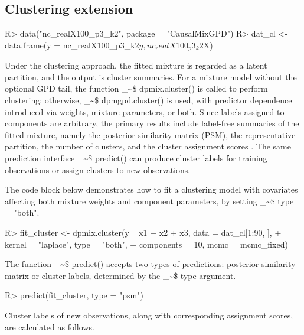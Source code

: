 \documentclass[preprint,12pt,authoryear]{elsarticle}
\makeatletter
\newcommand\code{\bgroup\@makeother\_\@makeother\~\@makeother\$\@codex}
\def\@codex#1{{\normalfont\ttfamily\hyphenchar\font=-1 #1}\egroup}
\renewenvironment{Schunk}{\vspace{0pt}}{\vspace{-0.1\baselineskip}}
\makeatother
\begin{document}
\subsection{Clustering extension}
\label{subsec:cluster_extension}

\begin{Schunk}
\begin{Sinput}
R> data("nc_realX100_p3_k2", package = "CausalMixGPD")
R> dat_cl <- data.frame(y = nc_realX100_p3_k2$y, nc_realX100_p3_k2$X)
\end{Sinput}
\end{Schunk}
Under the clustering approach, the fitted mixture is regarded as a latent partition, and the output is cluster summaries.  For a mixture model without the optional GPD tail, the function \code{dpmix.cluster()} is called to perform clustering; otherwise, \code{dpmgpd.cluster()} is used, with predictor dependence introduced via weights, mixture parameters, or both.  Since labels assigned to components are arbitrary, the primary results include label-free summaries of the fitted mixture, namely the posterior similarity matrix (PSM), the representative partition, the number of clusters, and the cluster assignment scores
\citep{Binder1978,Dahl2006}.  The same prediction interface \code{predict()} can produce cluster labels for training observations or assign clusters to new observations.

The code block below demonstrates how to fit a clustering model with covariates affecting both mixture weights and component parameters, by setting \code{type = "both"}.

\begin{Schunk}
\begin{Sinput}
R> fit_cluster <- dpmix.cluster(y ~ x1 + x2 + x3, data = dat_cl[1:90, ],
+                          kernel = "laplace", type = "both",
+                          components = 10, mcmc = mcmc_fixed)
\end{Sinput}
\end{Schunk}

The function \code{predict()} accepts two types of predictions: posterior similarity matrix or cluster labels, determined by the \code{type} argument.

\begin{Schunk}
\begin{Sinput}
R> predict(fit_cluster, type = "psm")
\end{Sinput}
\end{Schunk}

Cluster labels of new observations, along with corresponding assignment scores, are calculated as follows.
\end{document}
